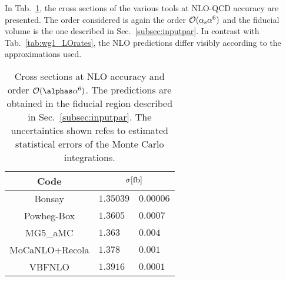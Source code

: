 In Tab.~\ref{tab:wg1_NLOrates}, the cross sections of the various tools at NLO-QCD accuracy are presented.
The order considered is again the order $\mathcal{O}(\alpha_{\rm s}\alpha^6)$ and the fiducial volume is the one described in Sec.~\ref{subsec:inputpar}.
In contrast with Tab.~\ref{tab:wg1_LOrates}, the NLO predictions differ visibly according to the approximations used.

\begin{table}[h!]
    \centering
    \begin{tabular}{c|r@{ $\pm$ }l}
      Code  &  \multicolumn{2}{c}{$\sigma[\rm{fb}]$}  \\
        \hline
        \hline
        {\sc Bonsay}  &  $1.35039$ & $0.00006$  \\
        {\sc Powheg-Box}  &  $1.3605\phantom{0}$  & $0.0007$   \\
        {\sc MG5\_aMC}&  $1.363\phantom{0}\phantom{0}$ & $0.004$  \\
        {\sc MoCaNLO+Recola}  &  $ 1.378\phantom{0}\phantom{0}$ & $0.001$ \\
        {\sc VBFNLO}  &  $1.3916\phantom{0}$ & $0.0001$  \\
    \end{tabular}
    \caption{\label{tab:wg1_NLOrates} Cross sections at NLO accuracy and order $\mathcal{O}(\alphas\alpha^6)$.
    The predictions are obtained in the fiducial region described in Sec.~\ref{subsec:inputpar}.
    The uncertainties shown refes to estimated statistical errors of the Monte Carlo integrations.}
\end{table}

